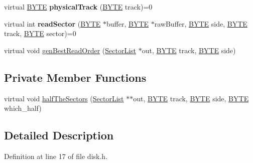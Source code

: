 \begin{DoxyCompactItemize}
\item 
\hypertarget{classDisk_ad76c2df7de610e3a30b725ea4a90f5fe}{}virtual \hyperlink{hi__types_8h_aae9749d96e15ccb4f482dd5f55d98f9b}{B\+Y\+T\+E} {\bfseries physical\+Track} (\hyperlink{hi__types_8h_aae9749d96e15ccb4f482dd5f55d98f9b}{B\+Y\+T\+E} track)=0\label{classDisk_ad76c2df7de610e3a30b725ea4a90f5fe}

\item 
\hypertarget{classDisk_ab2ef55264e354aa0afbd644a4fd0ee33}{}virtual int {\bfseries read\+Sector} (\hyperlink{hi__types_8h_aae9749d96e15ccb4f482dd5f55d98f9b}{B\+Y\+T\+E} $\ast$buffer, \hyperlink{hi__types_8h_aae9749d96e15ccb4f482dd5f55d98f9b}{B\+Y\+T\+E} $\ast$raw\+Buffer, \hyperlink{hi__types_8h_aae9749d96e15ccb4f482dd5f55d98f9b}{B\+Y\+T\+E} side, \hyperlink{hi__types_8h_aae9749d96e15ccb4f482dd5f55d98f9b}{B\+Y\+T\+E} track, \hyperlink{hi__types_8h_aae9749d96e15ccb4f482dd5f55d98f9b}{B\+Y\+T\+E} sector)=0\label{classDisk_ab2ef55264e354aa0afbd644a4fd0ee33}

\item 
virtual void \hyperlink{classDisk_a01a51ea25554387f047fb474c0814d53}{gen\+Best\+Read\+Order} (\hyperlink{disk_8h_structSectorList}{Sector\+List} $\ast$out, \hyperlink{hi__types_8h_aae9749d96e15ccb4f482dd5f55d98f9b}{B\+Y\+T\+E} track, \hyperlink{hi__types_8h_aae9749d96e15ccb4f482dd5f55d98f9b}{B\+Y\+T\+E} side)
\end{DoxyCompactItemize}
\subsection*{Private Member Functions}
\begin{DoxyCompactItemize}
\item 
virtual void \hyperlink{classDisk_a7dca6d0d1a9039beca59a0214d8fa32d}{half\+The\+Sectors} (\hyperlink{disk_8h_structSectorList}{Sector\+List} $\ast$$\ast$out, \hyperlink{hi__types_8h_aae9749d96e15ccb4f482dd5f55d98f9b}{B\+Y\+T\+E} track, \hyperlink{hi__types_8h_aae9749d96e15ccb4f482dd5f55d98f9b}{B\+Y\+T\+E} side, \hyperlink{hi__types_8h_aae9749d96e15ccb4f482dd5f55d98f9b}{B\+Y\+T\+E} which\+\_\+half)
\end{DoxyCompactItemize}


\subsection{Detailed Description}


Definition at line 17 of file disk.\+h.



